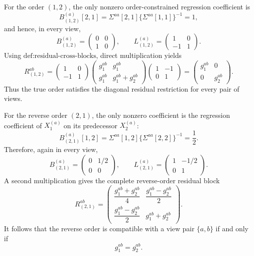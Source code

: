 For the order \((1,2)\), the only nonzero order-constrained regression coefficient is
\[
B_{(1,2)}^{(a)}[2,1]
=\Sigma^{aa}[2,1]\{\Sigma^{aa}[1,1]\}^{-1}=1,
\]
and hence, in every view,
\[
B_{(1,2)}^{(a)}=\begin{pmatrix}0&0\\1&0\end{pmatrix},
\qquad
L_{(1,2)}^{(a)}=\begin{pmatrix}1&0\\-1&1\end{pmatrix}.
\]
Using \(\text{def:residual-cross-blocks}\), direct multiplication yields
\[
R_{(1,2)}^{ab}
=\begin{pmatrix}1&0\\-1&1\end{pmatrix}
\begin{pmatrix}g_1^{ab}&g_1^{ab}\\g_1^{ab}&g_1^{ab}+g_2^{ab}\end{pmatrix}
\begin{pmatrix}1&-1\\0&1\end{pmatrix}
=\begin{pmatrix}g_1^{ab}&0\\0&g_2^{ab}\end{pmatrix}.
\]
Thus the true order satisfies the diagonal residual restriction for every pair of views.

For the reverse order \((2,1)\), the only nonzero coefficient is the regression coefficient of \(X_1^{(a)}\) on its predecessor \(X_2^{(a)}\):
\[
B_{(2,1)}^{(a)}[1,2]
=\Sigma^{aa}[1,2]\{\Sigma^{aa}[2,2]\}^{-1}=\frac12.
\]
Therefore, again in every view,
\[
B_{(2,1)}^{(a)}=\begin{pmatrix}0&1/2\\0&0\end{pmatrix},
\qquad
L_{(2,1)}^{(a)}=\begin{pmatrix}1&-1/2\\0&1\end{pmatrix}.
\]
A second multiplication gives the complete reverse-order residual block
\[
R_{(2,1)}^{ab}
=\begin{pmatrix}
\dfrac{g_1^{ab}+g_2^{ab}}4&\dfrac{g_1^{ab}-g_2^{ab}}2\\[4pt]
\dfrac{g_1^{ab}-g_2^{ab}}2&g_1^{ab}+g_2^{ab}
\end{pmatrix}.
\]
It follows that the reverse order is compatible with a view pair \(\{a,b\}\) if and only if
\[
g_1^{ab}=g_2^{ab}.
\]

